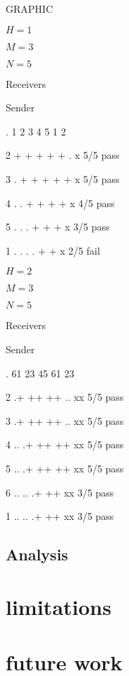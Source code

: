 \documentclass{article}
\begin{document}
GRAPHIC

$H = 1$

$M = 3$

$N = 5$

Receivers

  Sender

. 1 2 3 4 5 1 2
  
2 + + + + + . x 5/5 pass

3 . + + + + + x 5/5 pass

4 . . + + + + x 4/5 pass

5 . . . + + + x 3/5 pass

1 . . . . + + x 2/5 fail



$H = 2$

$M = 3$

$N = 5$

Receivers

  Sender

. 61 23 45 61 23
  
2 .+ ++ ++ .. xx 5/5 pass

3 .+ ++ ++ .. xx 5/5 pass

4 .. .+ ++ ++ xx 5/5 pass

5 .. .+ ++ ++ xx 5/5 pass

6 .. .. .+ ++ xx 3/5 pass

1 .. .. .+ ++ xx 3/5 pass

\subsection{Analysis}



\section{limitations}
\section{future work}
\end{document}

